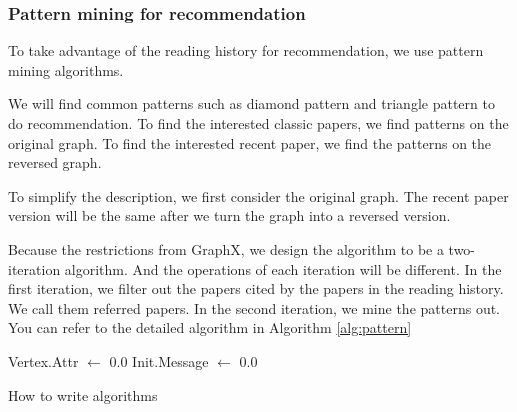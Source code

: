 \subsubsection{Pattern mining for recommendation}

To take advantage of the reading history for recommendation, we use pattern mining algorithms. 

We will find common patterns such as diamond pattern and triangle pattern to do recommendation. To find the interested classic papers, we find patterns on the original graph. To find the interested recent paper, we find the patterns on the reversed graph.

To simplify the description, we first consider the original graph. The recent paper version will be the same after we turn the graph into a reversed version.

Because the restrictions from GraphX, we design the algorithm to be a two-iteration algorithm. And the operations of each iteration will be different. In the first iteration, we filter out the papers cited by the papers in the reading history. We call them referred papers. In the second iteration, we mine the patterns out. You can refer to the detailed algorithm in Algorithm \ref{alg:pattern}

\begin{algorithm}
	{Vertex.Attr $\gets$ 0.0}
Init.Message $\gets$ 0.0

 \caption{How to write algorithms}
\end{algorithm}





